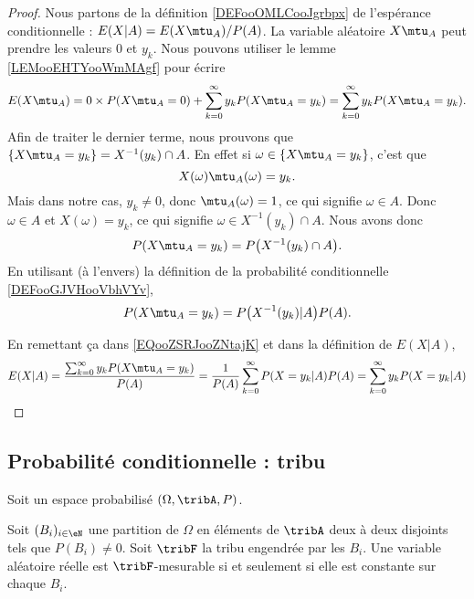 \begin{proof}
	Nous partons de la définition \ref{DEFooOMLCooJgrbpx} de l'espérance conditionnelle : \( E(X|A)=E(X\mtu_A)/P(A)\). La variable aléatoire \( X\mtu_A\) peut prendre les valeurs \( 0\) et  \( y_k\). Nous pouvons utiliser le lemme \ref{LEMooEHTYooWmMAgf} pour écrire
	\begin{equation}        \label{EQooZSRJooZNtajK}
		E(X\mtu_A)=0\times P(X\mtu_A=0)+\sum_{k=0}^{\infty}y_kP(X\mtu_A=y_k)=\sum_{k=0}^{\infty}y_kP(X\mtu_A=y_k).
	\end{equation}
	Afin de traiter le dernier terme, nous prouvons que \( \{ X\mtu_A=y_k \}=X^{-1}(y_k)\cap A\). En effet si \( \omega\in\{ X\mtu_A=y_k \}\), c'est que
	\begin{equation}
		X(\omega)\mtu_A(\omega)=y_k.
	\end{equation}
	Mais dans notre cas, \( y_k\neq 0\), donc \( \mtu_A(\omega)=1\), ce qui signifie \( \omega\in A\). Donc \( \omega\in A\) et \( X(\omega)=y_k\), ce qui signifie \( \omega\in X^{-1}(y_k)\cap A\). Nous avons donc
	\begin{equation}
		P(X\mtu_A=y_k)=P\big( X^{-1}(y_k)\cap A \big).
	\end{equation}
	En utilisant (à l'envers) la définition de la probabilité conditionnelle \ref{DEFooGJVHooVbhVYv},
	\begin{equation}
		P(X\mtu_A=y_k)=P\big( X^{-1}(y_k)|A \big)P(A).
	\end{equation}

	En remettant ça dans \eqref{EQooZSRJooZNtajK} et dans la définition de \( E(X|A)\),
	\begin{equation}
		E(X|A)=\frac{\sum_{k=0}^{\infty}y_kP(X\mtu_A=y_k)}{P(A)}=\frac{1}{ P(A) }\sum_{k=0}^{\infty}P(X=y_k|A)P(A)=\sum_{k=0}^{\infty}y_kP(X=y_k|A)
	\end{equation}
\end{proof}

\subsection{Probabilité conditionnelle : tribu}

Soit un espace probabilisé \( (\Omega,\tribA,P)\).

\begin{lemma}       \label{LEMooXXTYooZCXiYr}
	Soit \( (B_i)_{i\in\eN}\) une partition de \( \Omega\) en éléments de \( \tribA\) deux à deux disjoints tels que \( P(B_i)\neq 0\). Soit \( \tribF\) la tribu engendrée par les \( B_i\). Une variable aléatoire réelle est \( \tribF\)-mesurable si et seulement si elle est constante sur chaque \( B_i\).
\end{lemma}

